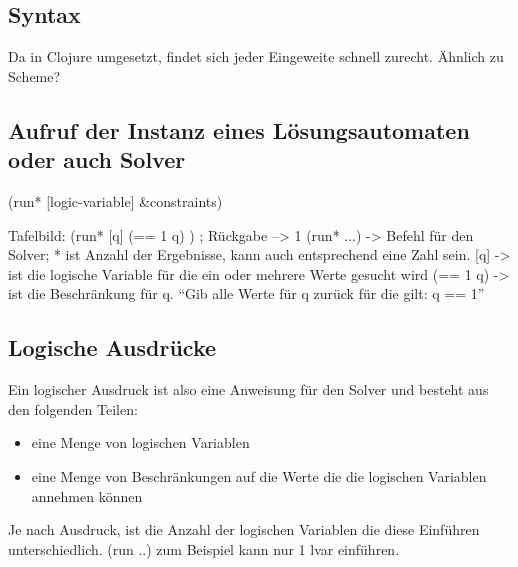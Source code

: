 \subsection{Syntax}

Da in Clojure umgesetzt, findet sich jeder Eingeweite schnell zurecht. Ähnlich zu Scheme?

\subsection{Aufruf der Instanz eines Lösungsautomaten oder auch Solver}

\begin{lstlistings}
    (run* [logic-variable] &constraints)
\end{lstlistings}


Tafelbild: (run* [q] (== 1 q) ) ; Rückgabe --> 1
(run* ...) -> Befehl für den Solver; * ist Anzahl der Ergebnisse, kann auch entsprechend eine Zahl sein.
[q] -> ist die logische Variable für die ein oder mehrere Werte gesucht wird
(== 1 q) -> ist die Beschränkung für q.
“Gib alle Werte für q zurück für die gilt: q == 1”


\subsection{Logische Ausdrücke}

Ein logischer Ausdruck ist also eine Anweisung für den Solver und besteht aus den folgenden Teilen:
\begin{itemize}

\item eine Menge von logischen Variablen

\item eine Menge von Beschränkungen auf die Werte die die logischen Variablen annehmen können

\end{itemize}

Je nach Ausdruck, ist die Anzahl der logischen Variablen die diese Einführen unterschiedlich. (run ..) zum Beispiel kann nur 1 lvar einführen.
